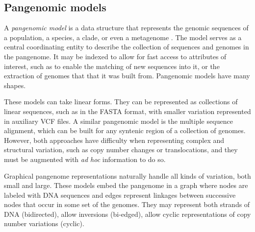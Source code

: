 
\subsection{Pangenomic models}

A \emph{pangenomic model} is a data structure that represents the genomic sequences of a population, a species, a clade, or even a metagenome \cite{computational2016computational}.
The model serves as a central coordinating entity to describe the collection of sequences and genomes in the pangenome.
It may be indexed to allow for fast access to attributes of interest, such as to enable the matching of new sequences into it, or the extraction of genomes that that it was built from.
Pangenomic models have many shapes.

These models can take linear forms.
They can be represented as collections of linear sequences, such as in the FASTA format, with smaller variation represented in auxiliary VCF files.
A similar pangenomic model is the multiple sequence alignment, which can be built for any syntenic region of a collection of genomes.
However, both approaches have difficulty when representing complex and structural variation, such as copy number changes or translocations, and they must be augmented with \textit{ad hoc} information to do so.

Graphical pangenome representations naturally handle all kinds of variation, both small and large.
These models embed the pangenome in a graph where nodes are labeled with DNA sequences and edges represent linkages between successive nodes that occur in some set of the genomes.
They may represent both strands of DNA (bidirected), allow inversions (bi-edged), allow cyclic representations of copy number variations (cyclic).

